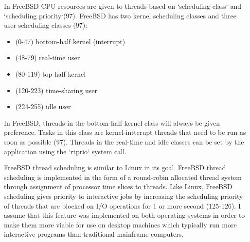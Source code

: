 \documentclass[onecolumn,10pt]{IEEETran}
\begin{document}
	In FreeBSD CPU resources are given to threads based on `scheduling class` and `scheduling priority`(97).  FreeBSD has two kernel scheduling classes and three user scheduling classes (97):
		\begin{itemize}
			\item (0-47) bottom-half kernel (interrupt)
			\item (48-79) real-time user
			\item (80-119) top-half kernel
			\item (120-223) time-sharing user
			\item (224-255) idle user
		\end{itemize}

	In FreeBSD, threads in the bottom-half kernel class will always be given preference.  Tasks in this class are kernel-intterupt threads that need to be run as soon as possible (97).  Threads in the real-time and idle classes can be set by the application using the `rtprio` system call.

	FreeBSD thread scheduling is similar to Linux in its goal.  FreeBSD thread scheduling is implemented in the form of a round-robin allocated thread system through assignment of processor time slices to threads.  Like Linux, FreeBSD scheduling gives priority to interactive jobs by increasing the scheduling priority of threads that are blocked on I/O operations for 1 or more second (125-126).  
	I assume that this feature was implemented on both operating systems in order to make them more viable for use on desktop machines which typically run more interactive programs than traditional mainframe computers.
\end{document}
